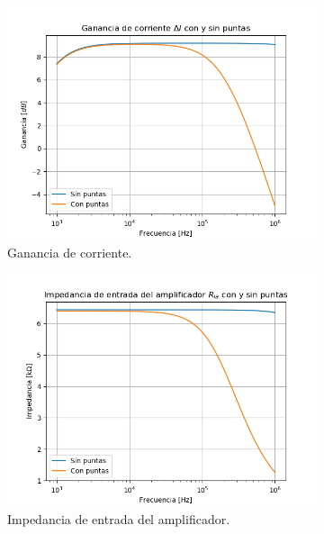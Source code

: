 \begin{figure}[H]
\centering
\begin{subfigure}{.49\textwidth}
\centering
	\includegraphics[width=\textwidth]{Imagenes/Ai_cp.png}
	\caption{Ganancia de corriente.}
	\label{fig:ai-cp}
\end{subfigure}
\begin{subfigure}{.49\textwidth}
\centering
	\includegraphics[width=\textwidth]{Imagenes/Ria_cp.png}
	\caption{Impedancia de entrada del amplificador.}
	\label{fig:ria-cp}
\end{subfigure}
\begin{subfigure}{.5\textwidth}
\centering

\end{subfigure}
\end{figure}
